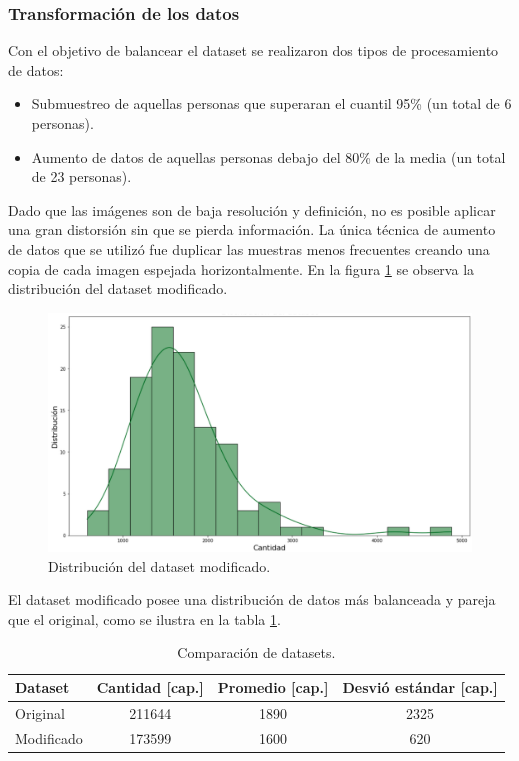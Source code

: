 \subsubsection{Transformación de los datos}

Con el objetivo de balancear el dataset se realizaron dos tipos de procesamiento de datos:
\begin{itemize}
\item Submuestreo de aquellas personas que superaran el cuantil 95\% (un total de 6 personas).
\item Aumento de datos de aquellas personas debajo del 80\% de la media (un total de 23 personas).
\end{itemize}

Dado que las imágenes son de baja resolución y definición, no es posible aplicar una gran distorsión sin que se pierda información. La única técnica de aumento de datos que se utilizó fue duplicar las muestras menos frecuentes creando una copia de cada imagen espejada horizontalmente. En la figura \ref{fig:distribucionFinal} se observa la distribución del dataset modificado.

\newpage

\begin{figure}[ht]
	\centering
	\includegraphics[scale=.50]{./Figures/distribucionFinal.png}
	\caption{Distribución del dataset modificado.}
	\label{fig:distribucionFinal}
\end{figure}

El dataset modificado posee una distribución de datos más balanceada y pareja que el original, como se ilustra en la tabla \ref{tab:datasets}.

\begin{table}[h]
	\centering
	\caption[Dataset]{Comparación de datasets.}
	\begin{tabular}{l c c c}    
		\toprule
		\textbf{Dataset}   & \textbf{Cantidad [cap.]} & \textbf{Promedio [cap.]} & \textbf{Desvió estándar [cap.]}\\
		\midrule
		Original & 211644 & 1890   & 2325 \\		
		Modificado & 173599 & 1600  & 620 \\
		\bottomrule
		\hline
	\end{tabular}
	\label{tab:datasets}
\end{table}

